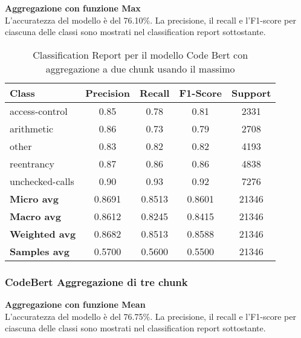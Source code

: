 \documentclass[../../Thesis.tex]{subfiles}
\begin{document}
\textbf{Aggregazione con funzione Max}\\
L'accuratezza del modello è del 76.10\%. La precisione, il recall e l'F1-score per ciascuna delle classi sono mostrati nel classification report sottostante.
\begin{table}[H]
    \centering
    \small
    \begin{tabular}{lcccc}
    \hline
    \textbf{Class} & \textbf{Precision} & \textbf{Recall} & \textbf{F1-Score} & \textbf{Support} \\
    \hline
    access-control & 0.85 & 0.78 & 0.81 & 2331 \\
    arithmetic & 0.86 & 0.73 & 0.79 & 2708 \\
    other & 0.83 & 0.82 & 0.82 & 4193 \\
    reentrancy & 0.87 & 0.86 & 0.86 & 4838 \\
    unchecked-calls & 0.90 & 0.93 & 0.92 & 7276 \\
    \hline
    \textbf{Micro avg} & 0.8691 & 0.8513 & 0.8601 & 21346 \\
    \textbf{Macro avg} & 0.8612 & 0.8245 & 0.8415 & 21346 \\
    \textbf{Weighted avg} & 0.8682 & 0.8513 & 0.8588 & 21346 \\
    \textbf{Samples avg} & 0.5700 & 0.5600 & 0.5500 & 21346 \\
    \hline
    \end{tabular}
    \caption{Classification Report per il modello Code Bert con aggregazione a due chunk usando il massimo}
    \end{table}

\subsubsection{CodeBert Aggregazione di tre chunk}
    \textbf{Aggregazione con funzione Mean}\\
    L'accuratezza del modello è del 76.75\%. La precisione, il recall e l'F1-score per ciascuna delle classi sono mostrati nel classification report sottostante.
    
\end{document}
